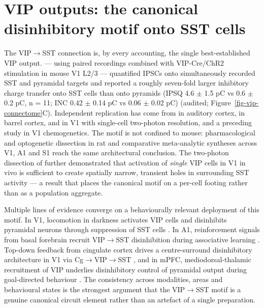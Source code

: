 \documentclass[11pt]{article}
\let\origrightarrow\rightarrow
\def\rightarrow{\ensuremath{\origrightarrow}}
\begin{document}
\section{VIP outputs: the canonical disinhibitory motif onto SST cells}

The VIP\rightarrow SST connection is, by every accounting, the single best-established VIP output. \citet{Pfeffer2013} --- using paired recordings combined with VIP-Cre/ChR2 stimulation in mouse V1 L2/3 --- quantified IPSCs onto simultaneously recorded SST and pyramidal targets and reported a roughly seven-fold larger inhibitory charge transfer onto SST cells than onto pyramids (IPSQ 4.6 $\pm$ 1.5 pC vs 0.6 $\pm$ 0.2 pC, n = 11; INC 0.42 $\pm$ 0.14 pC vs 0.06 $\pm$ 0.02 pC) (audited; Figure~\ref{fig-vip-connectome}C). Independent replication has come from \citet{Pi2013} in auditory cortex, \citet{Lee2013} in barrel cortex, \citet{Karnani2016a} and \citet{Karnani2016b} in V1 with single-cell two-photon resolution, and a preceding study in V1 chemogenetics. The motif is not confined to mouse: pharmacological and optogenetic dissection in rat \citep{Pronneke2019} and comparative meta-analytic syntheses across V1, A1 and S1 \citep{Guetmccreight2020b, Pronneke2019} reach the same architectural conclusion. The two-photon dissection of \citet{Karnani2016b} further demonstrated that activation of \textit{single} VIP cells in V1 in vivo is sufficient to create spatially narrow, transient holes in surrounding SST activity --- a result that places the canonical motif on a per-cell footing rather than as a population aggregate.

Multiple lines of evidence converge on a behaviourally relevant deployment of this motif. In V1, locomotion in darkness activates VIP cells and disinhibits pyramidal neurons through suppression of SST cells \citep{Fu2014, Dipoppa2018}. In A1, reinforcement signals from basal forebrain recruit VIP\rightarrow SST disinhibition during associative learning \citep{Pi2013, Letzkus2011}. Top-down feedback from cingulate cortex drives a centre-surround disinhibitory architecture in V1 via Cg\rightarrow VIP\rightarrow SST \citep{Zhang2014, Stachniak2023, Bastos2023a}, and in mPFC, mediodorsal-thalamic recruitment of VIP underlies disinhibitory control of pyramidal output during goal-directed behaviour \citep{Anastasiades2021a, Kamigaki2017, Pinto2015}. The consistency across modalities, areas and behavioural states is the strongest argument that the VIP\rightarrow SST motif is a genuine canonical circuit element rather than an artefact of a single preparation.
\end{document}
